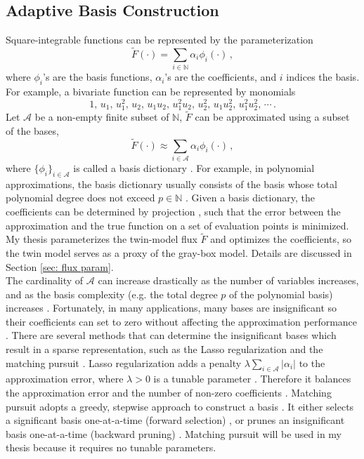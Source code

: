 \subsection{Adaptive Basis Construction}
\label{sec: adaptive basis review}
Square-integrable functions
can be represented by the parameterization 
\begin{equation}
    \tilde{F}(\cdot) = \sum_{i\in \mathbb{N}} {\alpha_i} \phi_i(\cdot)\,,
    \label{eqn: linear param general}
\end{equation}
where $\phi_i$'s are the basis functions, $\alpha_i$'s are the coefficients, and $i$
indices the basis. For example, 
a bivariate function can be represented by monomials
\begin{equation*}
    1,\,  u_1,\, u_1^2,\,
    u_2,\, u_1 u_2,\,  u_1^2 u_2, \,
    u_2^2,\,  u_1 u_2^2,\,  u_1^2 u_2^2,\, \cdots\,.
\end{equation*}
Let $\mathcal{A}$ be a non-empty finite subset of $\mathbb{N}$,
$\tilde{F}$ can be approximated using a subset of the bases, 
\begin{equation}
    \tilde{F}(\cdot) \approx \sum_{i\in \mathcal{A}} {\alpha_i} \phi_i(\cdot)\,,
    \label{eqn: linear param truncate}
\end{equation}
where $\{\phi_i\}_{i\in \mathcal{A}}$ is called a basis dictionary \cite{match pursuit}. 
For example, in polynomial approximations, the basis dictionary usually consists of
the basis whose total polynomial degree does not exceed $p\in \mathbb{N}$ \cite{PCE}.
Given a basis dictionary, the coefficients can be determined by projection \cite{PCE}, 
such that the error between the approximation
and the true function on a set of evaluation points 
is minimized. My thesis parameterizes the twin-model flux $\tilde{F}$ and
optimizes the coefficients,
so the twin model serves as a proxy of the gray-box model. Details are discussed in 
Section \ref{sec: flux param}.\\

The cardinality of $\mathcal{A}$ can increase drastically as the number of variables increases, and
as the basis complexity (e.g. the total degree $p$ of the polynomial basis) increases \cite{PCE}.
Fortunately, in many applications, 
many bases are insignificant so their coefficients can set to zero without affecting the approximation 
performance \cite{match pursuit}. 
There are several methods that can determine the insignificant bases which result 
in a sparse representation, such as the Lasso regularization 
\cite{Lasso variable selection} and the matching 
pursuit \cite{match pursuit}. Lasso regularization adds a penalty $\lambda
\sum_{i\in\mathcal{A}}|\alpha_i|$
to the approximation error, where $\lambda>0$ is a tunable parameter \cite{Lasso variable selection}. 
Therefore it balances the approximation error and the number of non-zero
coefficients \cite{Lasso variable selection}.
Matching pursuit adopts a greedy, stepwise approach to construct a basis \cite{match pursuit}.
It either selects a significant basis one-at-a-time (forward selection) \cite{forward selection},
or prunes an insignificant basis one-at-a-time (backward pruning) \cite{backward prune}.
Matching pursuit will be used in my thesis because it requires no tunable parameters. \\

